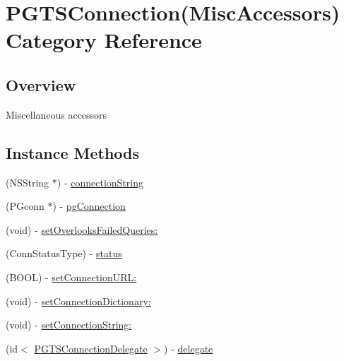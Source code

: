 \hypertarget{category_p_g_t_s_connection_07_misc_accessors_08}{}\section{P\+G\+T\+S\+Connection(Misc\+Accessors) Category Reference}
\label{category_p_g_t_s_connection_07_misc_accessors_08}


\subsection{Overview}
Miscellaneous accessors \subsection*{Instance Methods}
\begin{DoxyCompactItemize}
\item 
(N\+S\+String $\ast$) -\/ \hyperlink{category_p_g_t_s_connection_07_misc_accessors_08_a9750ed8f94634937b940a62e42a745b8}{connection\+String}
\item 
(P\+Gconn $\ast$) -\/ \hyperlink{category_p_g_t_s_connection_07_misc_accessors_08_a74e9db46d80376853bada84e2ec370ff}{pg\+Connection}
\item 
(void) -\/ \hyperlink{category_p_g_t_s_connection_07_misc_accessors_08_affcfc72eb15f19ee4e1952c26dc5c932}{set\+Overlooks\+Failed\+Queries\+:}
\item 
(Conn\+Status\+Type) -\/ \hyperlink{category_p_g_t_s_connection_07_misc_accessors_08_abaf1ed2f2f5eb4bbfbe0e0e10bedcce8}{status}
\end{DoxyCompactItemize}
{\bf }\par
\begin{DoxyCompactItemize}
\item 
(B\+O\+O\+L) -\/ \hyperlink{category_p_g_t_s_connection_07_misc_accessors_08_a34a225a33c9a2ae107fdcc21303b7371}{set\+Connection\+U\+R\+L\+:}
\item 
(void) -\/ \hyperlink{category_p_g_t_s_connection_07_misc_accessors_08_aae94caf61241aca0a02175a5f024d282}{set\+Connection\+Dictionary\+:}
\item 
(void) -\/ \hyperlink{category_p_g_t_s_connection_07_misc_accessors_08_a9498870ef37387d3d26dc40f5364bdbb}{set\+Connection\+String\+:}
\end{DoxyCompactItemize}

{\bf }\par
\begin{DoxyCompactItemize}
\item 
(id$<$ \hyperlink{protocol_p_g_t_s_connection_delegate-p}{P\+G\+T\+S\+Connection\+Delegate} $>$) -\/ \hyperlink{category_p_g_t_s_connection_07_misc_accessors_08_a6cbb1926a0f65bb01fdfea578187cb03}{delegate}
\end{DoxyCompactItemize}

